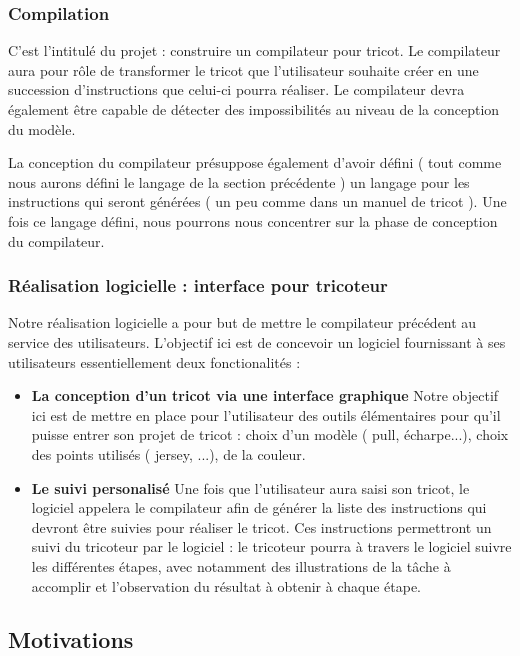 \documentclass{article}
\begin{document}
\subsubsection{Compilation}

C'est l'intitulé du projet : construire un compilateur pour tricot. Le compilateur aura pour rôle de transformer le tricot que 
l'utilisateur souhaite créer en une succession d'instructions que celui-ci pourra réaliser. Le compilateur devra également être capable de 
détecter des impossibilités au niveau de la conception du modèle.

La conception du compilateur présuppose également d'avoir défini ( tout comme nous aurons défini le langage de la section précédente ) un 
langage pour les instructions qui seront générées ( un peu comme dans un manuel de tricot ). 
Une fois ce langage défini, nous pourrons nous concentrer sur la phase de conception du compilateur. 

\subsubsection{Réalisation logicielle : interface pour tricoteur}

Notre réalisation logicielle a pour but de mettre le compilateur précédent au service des utilisateurs. 
L'objectif ici est de concevoir un logiciel fournissant à ses utilisateurs essentiellement deux fonctionalités :
\begin{itemize} 
  \item \textbf{La conception d'un tricot via une interface graphique} Notre objectif ici est de mettre en place pour l'utilisateur des
  outils élémentaires pour qu'il puisse entrer son projet de tricot : choix d'un modèle ( pull, écharpe...), choix des points utilisés 
  ( jersey, ...), de la couleur.
  \item \textbf{Le suivi personalisé} Une fois que l'utilisateur aura saisi son tricot, le logiciel appelera le compilateur afin de générer 
la liste des instructions qui devront être suivies pour réaliser le tricot. Ces instructions permettront un suivi du tricoteur par le 
logiciel : le tricoteur pourra à travers le logiciel suivre les différentes étapes, avec notamment des illustrations de la tâche à 
accomplir et l'observation du résultat à obtenir à chaque étape.
\end{itemize}

\subsection{Motivations}
\end{document}
